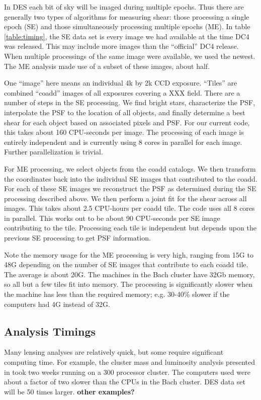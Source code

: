 \documentclass[12pt]{article}
\begin{document}
In DES each bit of sky will be imaged during multiple epochs.  Thus there are
generally two types of algorithms for measuring shear: those processing a
single epoch (SE) and those simultaneously processing multiple epochs (ME).  In
table \ref{table:timing}, the SE data set is every image we had available
at the time DC4 was released. This may include more images than the ``official''
DC4 release.  When multiple processings of the same image were available, we
used the newest. The ME analysis made use of a subset of these images, about
half.

One ``image'' here means an individual 4k by 2k CCD exposure.  ``Tiles'' are
combined ``coadd'' images of all exposures covering a XXX field.  There are a
number of steps in the SE processing. We find bright stars, characterize the
PSF, interpolate the PSF to the location of all objects, and finally determine
a best shear for each object based on associated pixels and PSF.  For our
current code, this takes about 160 CPU-seconds per image.  The processing of
each image is entirely independent and is currently using 8 cores in parallel
for each image.  Further parallelization is trivial.

For ME processing, we select objects from the coadd catalogs.  We then
transform the coordinates back into the individual SE images that contributed
to the coadd.  For each of these SE images we reconstruct the PSF as determined
during the SE processing described above. We then perform a joint fit for the
shear across all images.  This takes about 2.5 CPU-hours per coadd tile. The
code uses all 8 cores in parallel. This works out to be about 90 CPU-seconds
per SE image contributing to the tile.  Processing each tile is independent but
depends upon the previous SE processing to get PSF information.

Note the memory usage for the ME processing is very high, ranging from 15G to
48G depending on the number of SE images that contribute to each coadd tile.
The average is about 20G.  The machines in the Bach cluster have 32Gb memory,
so all but a few tiles fit into memory.  The processing is significantly slower
when the machine has less than the required memory; e.g. 30-40\% slower if the
computers had 4G instead of 32G. 

\subsection{Analysis Timings}

Many lensing analyses are relatively quick, but some require significant
computing time.  For example, the cluster mass and luminosity analysis
presented in \cite{SheldonM2L07} took two weeks running on a 300 processor
cluster.  The computers used were about a factor of two slower than the CPUs in
the Bach cluster.  DES data set will be 50 times larger.  {\bf other
examples?}
\end{document}
